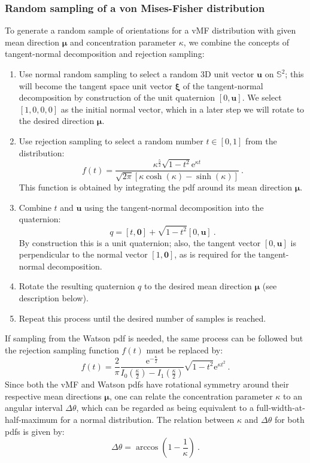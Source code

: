 \subsubsection{Random sampling of a von Mises-Fisher distribution}
To generate a random sample of orientations for a vMF distribution with given mean direction $\bm{\mu}$ and concentration parameter $\kappa$, we combine the concepts of tangent-normal decomposition and rejection sampling:
\begin{enumerate}
	\item Use normal random sampling to select a random 3D unit vector $\mathbf{u}$ on $\mathbb{S}^2$; this will become the tangent space unit vector $\bm{\xi}$ of the tangent-normal decomposition by construction of the unit quaternion $[0,\mathbf{u}]$. We select $[1,0,0,0]$ as the initial normal vector, which in a later step we will rotate to the desired direction $\bm{\mu}$.
	\item Use rejection sampling to select a random number $t\in[0,1]$ from the distribution:
	\begin{equation}
		f(t) = \frac{\kappa^{\frac{5}{2}}\sqrt{1-t^2}\mathrm{e}^{\kappa t}}{\sqrt{2\pi}[\kappa\cosh(\kappa)-\sinh(\kappa)]}\ .\label{\chabbr:eq:rejectionnMF}
	\end{equation}
	This function is obtained by integrating the pdf around its mean direction $\bm{\mu}$.
	\item Combine $t$ and $\mathbf{u}$ using the tangent-normal decomposition into the quaternion:
	\begin{equation}
		q = [t,\mathbf{0}] + \sqrt{1-t^2}[0,\mathbf{u}]\ .
	\end{equation}
	By construction this is a unit quaternion; also, the tangent vector $[0,\mathbf{u}]$ is perpendicular to the normal vector $[1,\mathbf{0}]$, as is required for the tangent-normal decomposition.
	\item Rotate the resulting quaternion $q$ to the desired mean direction $\bm{\mu}$ (see description below).
	\item Repeat this process until the desired number of samples is reached.
\end{enumerate}

If sampling from the Watson pdf is needed, the same process can be followed but the rejection sampling function $f(t)$ must be replaced by:
\begin{equation}
	f(t) = \frac{2}{\pi}\frac{\mathrm{e}^{-\frac{\kappa}{2}}}{I_0(\frac{\kappa}{2})-I_1(\frac{\kappa}{2})}\sqrt{1-t^2}\mathrm{e}^{\kappa t^2}\ .
\end{equation}
Since both the vMF and Watson pdfs have rotational symmetry around their respective mean directions $\bm{\mu}$, one can relate the concentration parameter $\kappa$ to an angular interval $\Delta\theta$, which can be regarded as being equivalent to a full-width-at-half-maximum for a normal distribution.  The relation between $\kappa$ and $\Delta\theta$ for both pdfs is given by:
\begin{equation}
	\Delta\theta = \arccos(1-\frac{1}{\kappa})\ .
\end{equation}


